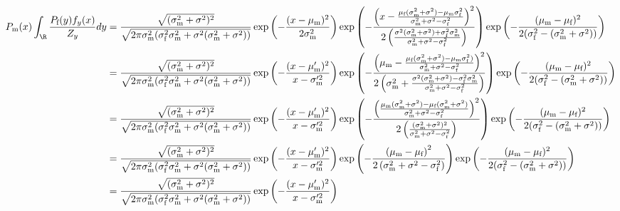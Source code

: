 \documentclass{article}\usepackage[]{graphicx}\usepackage[]{color}
\newcommand{\x}[1]{\text{#1}}
\begin{document}
\begin{landscape}
\begin{align*}
P_\x{m}(x)\int_\R \frac{P_\x{f}(y)f_y(x)}{Z_y} dy&=\frac{\sqrt{(\sigma_\x{m}^2+\sigma^2)^2}}{\sqrt{2\pi\sigma_\x{m}^2(\sigma_\x{f}^2\sigma_\x{m}^2+\sigma^2(\sigma_\x{m}^2+\sigma^2))}}\exp\left(-\frac{(x-\mu_\x{m})^2}{2\sigma_\x{m}^2}\right)\exp\left(-\frac{\left(x-\frac{\mu_\x{f}(\sigma_\x{m}^2+\sigma^2)-\mu_\x{m}\sigma_\x{f}^2}{\sigma_\x{m}^2+\sigma^2-\sigma_\x{f}^2}\right)^2}{2\left(\frac{\sigma^2(\sigma_\x{m}^2+\sigma^2)+\sigma_\x{f}^2\sigma_\x{m}^2}{\sigma_\x{m}^2+\sigma^2-\sigma_\x{f}^2}\right)}\right)\exp\left(-\frac{(\mu_\x{m}-\mu_\x{f})^2}{2(\sigma_\x{f}^2-(\sigma_\x{m}^2+\sigma^2))}\right)
\\&=\frac{\sqrt{(\sigma_\x{m}^2+\sigma^2)^2}}{\sqrt{2\pi\sigma_\x{m}^2(\sigma_\x{f}^2\sigma_\x{m}^2+\sigma^2(\sigma_\x{m}^2+\sigma^2))}}\exp\left(-\frac{(x-\mu_\x{m}')^2}{x-\sigma_\x{m}'^2}\right)\exp\left(-\frac{\left(\mu_\x{m}-\frac{\mu_\x{f}(\sigma_\x{m}^2+\sigma^2)-\mu_\x{m}\sigma_\x{f}^2)}{\sigma_\x{m}^2+\sigma^2-\sigma_\x{f}^2}\right)^2}{2\left(\sigma_\x{m}^2+\frac{\sigma^2(\sigma_\x{m}^2+\sigma^2)-\sigma_\x{f}^2\sigma_\x{m}^2}{\sigma_\x{m}^2+\sigma^2-\sigma_\x{f}^2}\right)}\right)\exp\left(-\frac{(\mu_\x{m}-\mu_\x{f})^2}{2(\sigma_\x{f}^2-(\sigma_\x{m}^2+\sigma^2))}\right)
\\&=\frac{\sqrt{(\sigma_\x{m}^2+\sigma^2)^2}}{\sqrt{2\pi\sigma_\x{m}^2(\sigma_\x{f}^2\sigma_\x{m}^2+\sigma^2(\sigma_\x{m}^2+\sigma^2))}}\exp\left(-\frac{(x-\mu_\x{m}')^2}{x-\sigma_\x{m}'^2}\right)\exp\left(-\frac{\left(\frac{\mu_\x{m}(\sigma_\x{m}^2+\sigma^2)-\mu_\x{f}(\sigma_\x{m}^2+\sigma^2)}{\sigma_\x{m}^2+\sigma^2-\sigma_\x{f}^2}\right)^2}{2\left(\frac{(\sigma_\x{m}^2+\sigma^2)^2}{\sigma_\x{m}^2+\sigma^2-\sigma_\x{f}^2}\right)}\right)\exp\left(-\frac{(\mu_\x{m}-\mu_\x{f})^2}{2(\sigma_\x{f}^2-(\sigma_\x{m}^2+\sigma^2))}\right)
\\&=\frac{\sqrt{(\sigma_\x{m}^2+\sigma^2)^2}}{\sqrt{2\pi\sigma_\x{m}^2(\sigma_\x{f}^2\sigma_\x{m}^2+\sigma^2(\sigma_\x{m}^2+\sigma^2))}}\exp\left(-\frac{(x-\mu_\x{m}')^2}{x-\sigma_\x{m}'^2}\right)\exp\left(-\frac{\left(\mu_\x{m}-\mu_\x{f}\right)^2}{2\left(\sigma_\x{m}^2+\sigma^2-\sigma_\x{f}^2\right)}\right)\exp\left(-\frac{(\mu_\x{m}-\mu_\x{f})^2}{2(\sigma_\x{f}^2-(\sigma_\x{m}^2+\sigma^2))}\right)
\\&=\frac{\sqrt{(\sigma_\x{m}^2+\sigma^2)^2}}{\sqrt{2\pi\sigma_\x{m}^2(\sigma_\x{f}^2\sigma_\x{m}^2+\sigma^2(\sigma_\x{m}^2+\sigma^2))}}\exp\left(-\frac{(x-\mu_\x{m}')^2}{x-\sigma_\x{m}'^2}\right)

\end{align*}
\end{landscape}
\end{document}
